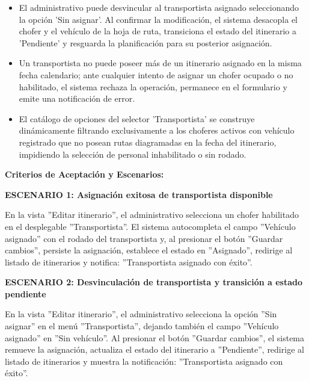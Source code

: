 \documentclass[a4paper,9pt]{article}
\begin{document}
\begin{tcolorbox}
{\begin{itemize}[leftmargin=12pt, nosep, itemsep=1.5pt, topsep=1pt]
\item El administrativo puede desvincular al transportista asignado seleccionando la opción 'Sin asignar'. Al confirmar la modificación, el sistema desacopla el chofer y el vehículo de la hoja de ruta, transiciona el estado del itinerario a 'Pendiente' y resguarda la planificación para su posterior asignación.
\item Un transportista no puede poseer más de un itinerario asignado en la misma fecha calendario; ante cualquier intento de asignar un chofer ocupado o no habilitado, el sistema rechaza la operación, permanece en el formulario y emite una notificación de error.
\item El catálogo de opciones del selector 'Transportista' se construye dinámicamente filtrando exclusivamente a los choferes activos con vehículo registrado que no posean rutas diagramadas en la fecha del itinerario, impidiendo la selección de personal inhabilitado o sin rodado.
\end{itemize}
}\par\vspace{3pt}
\noindent\textbf{\footnotesize Criterios de Aceptación y Escenarios:}\par\vspace{2pt}
{\footnotesize
\noindent\textbf{\textcolor{secondarydark}{ESCENARIO 1:  Asignación exitosa de transportista disponible}}\par\vspace{1pt}
En la vista ''Editar itinerario'', el administrativo selecciona un chofer habilitado en el desplegable ''Transportista''. El sistema autocompleta el campo ''Vehículo asignado'' con el rodado del transportista y, al presionar el botón ''Guardar cambios'', persiste la asignación, establece el estado en ''Asignado'', redirige al listado de itinerarios y notifica: ''Transportista asignado con éxito''.\par\vspace{2.5pt}
\noindent\textbf{\textcolor{secondarydark}{ESCENARIO 2:  Desvinculación de transportista y transición a estado pendiente}}\par\vspace{1pt}
En la vista ''Editar itinerario'', el administrativo selecciona la opción ''Sin asignar'' en el menú ''Transportista'', dejando también el campo ''Vehículo asignado'' en ''Sin vehículo''. Al presionar el botón ''Guardar cambios'', el sistema remueve la asignación, actualiza el estado del itinerario a ''Pendiente'', redirige al listado de itinerarios y muestra la notificación: ''Transportista asignado con éxito''.\par\vspace{2.5pt}
}
\end{tcolorbox}
\end{document}
